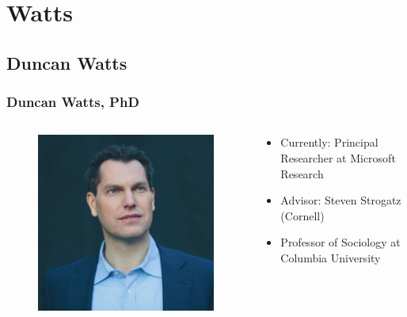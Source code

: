 \documentclass[compress]{beamer}
\begin{document}
\section{Watts}

\subsection{Duncan Watts}

    \begin{frame}[Basic2]\frametitle{Duncan Watts, PhD}
        \begin{columns}
            \begin{column}{0.4\textwidth}
                \begin{figure}
                    \centering
                    \includegraphics[width=0.8\linewidth]{../figures/watts_twitter}
                    \caption{}
                    \label{fig:wattstwitter}
                \end{figure}
            \end{column}
            \begin{column}{0.6\textwidth}
                \begin{itemize}
                    \footnotesize
                    \item Currently: Principal Researcher at Microsoft Research
                    \item Advisor: Steven Strogatz (Cornell)
                    \item Professor of Sociology at Columbia University
                    \begin{enumerate}

\end{enumerate}
\end{itemize}
\end{column}
\end{columns}
\end{frame}
\end{document}
